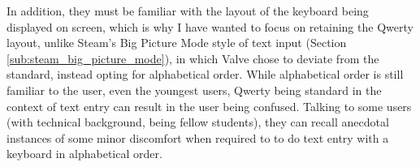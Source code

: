 \documentclass[requirements.tex]{subfiles}
\begin{document}
In addition, they must be familiar with the layout of the keyboard being
displayed on screen, which is why I have wanted to focus on retaining the Qwerty
layout, unlike Steam's Big Picture Mode style of text input (Section
\ref{sub:steam_big_picture_mode}), in which Valve chose to deviate from the 
standard, instead opting for alphabetical order. While alphabetical order is
still familiar to the user, even the youngest users, Qwerty being standard in
the context of text entry can result in the user being confused. Talking to
some users (with technical background, being fellow students), they can recall
anecdotal instances of some minor discomfort when required to to do text entry
with a keyboard in alphabetical order.
\newpage
\end{document}

